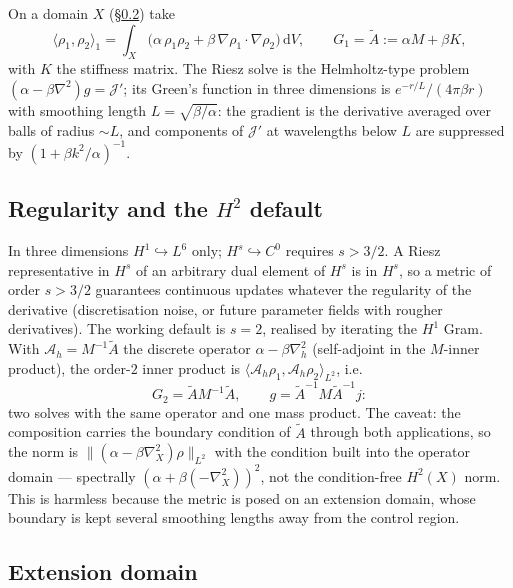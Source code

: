 \documentclass[11pt]{article}
\newcommand{\Jf}{\mathscr{J}}  %
\newcommand{\dV}{\,\mathrm{d}V}
\newcommand{\norm}[1]{\lVert #1 \rVert}
\newcommand{\ip}[2]{\langle #1, #2\rangle}
\begin{document}
On a domain $X$ (\S\ref{sec:extension}) take
\begin{equation}
  \ip{\rho_1}{\rho_2}_{1} = \int_X\bigl(\alpha\,\rho_1\rho_2
  + \beta\,\nabla\rho_1\cdot\nabla\rho_2\bigr)\dV ,
  \qquad G_1 = \tilde A := \alpha M + \beta K ,
\end{equation}
with $K$ the stiffness matrix. The Riesz solve is the Helmholtz-type
problem $(\alpha - \beta\nabla^2)g = \Jf'$; its Green's function in three
dimensions is $e^{-r/L}/(4\pi\beta r)$ with smoothing length
$L = \sqrt{\beta/\alpha}$: the gradient is the derivative averaged over
balls of radius $\sim L$, and components of $\Jf'$ at wavelengths below $L$
are suppressed by $(1 + \beta k^2/\alpha)^{-1}$.

\subsection{\texorpdfstring{Regularity and the $H^2$ default}{Regularity and the H2 default}}

In three dimensions $H^1 \hookrightarrow L^6$ only; $H^s
\hookrightarrow C^0$ requires $s > 3/2$. A Riesz representative in $H^s$
of an arbitrary dual element of $H^s$ is in $H^s$, so a metric of order
$s > 3/2$ guarantees continuous updates whatever the regularity of the
derivative (discretisation noise, or future parameter fields with
rougher derivatives). The working default is $s = 2$, realised by
iterating the $H^1$ Gram. With $\mathcal{A}_h = M^{-1}\tilde A$ the
discrete operator $\alpha - \beta\nabla^2_h$ (self-adjoint in the
$M$-inner product), the order-$2$ inner product is
$\ip{\mathcal{A}_h\rho_1}{\mathcal{A}_h\rho_2}_{L^2}$, i.e.
\begin{equation}
  G_2 = \tilde A M^{-1}\tilde A , \qquad
  g = \tilde A^{-1} M \tilde A^{-1} j :
\end{equation}
two solves with the same operator and one mass product. The caveat: the
composition carries the boundary condition of $\tilde A$ through both
applications, so the norm is $\norm{(\alpha - \beta\nabla^2_X)\rho}_{L^2}$
with the condition built into the operator domain --- spectrally
$(\alpha + \beta(-\nabla^2_X))^{2}$, not the condition-free $H^2(X)$
norm. This is harmless because the metric is posed on an extension
domain, whose boundary is kept several smoothing lengths away from the
control region.

\subsection{Extension domain}
\label{sec:extension}
\end{document}
